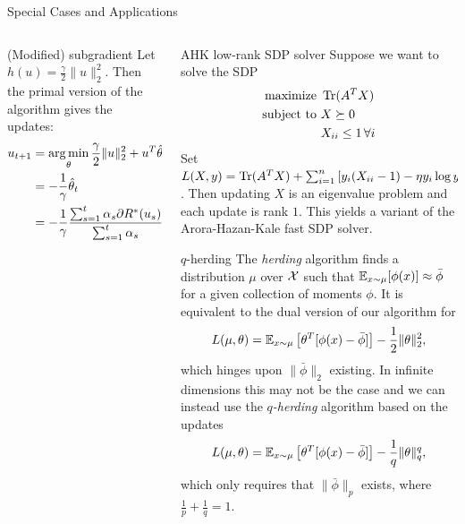 \documentclass[final]{beamer}
\begin{document}
\begin{frame}{}
\begin{columns}
\begin{column}{0.50\linewidth}
\begin{block}{\large Special Cases and Applications}
\begin{columns}[t]
\begin{column}{0.47\linewidth}
\begin{block}{(Modified) subgradient}
Let $h(u) = \frac{\gamma}{2} \|u\|_2^2$. Then the primal version of the 
algorithm gives the updates:
\begin{align*}
u_{t+1} &= \argmin_{\theta} \frac{\gamma}{2}\|u\|_2^2 + u^T\hat{\theta}_t \\
 &= -\frac{1}{\gamma}\hat{\theta}_t \\
 &= -\frac{1}{\gamma} \frac{\sum_{s=1}^t \alpha_s \partial R^*(u_s)}{\sum_{s=1}^t \alpha_s}.
\end{align*}
\end{block}

\end{column}
\begin{column}{0.47\linewidth}
\begin{block}{AHK low-rank SDP solver}
Suppose we want to solve the SDP
\begin{align*}
\text{maximize }   & \operatorname{Tr}(A^TX) \\
\text{subject to } & X \succeq 0 \\
                  & X_{ii} \leq 1 \, \forall i
\end{align*}
Set \small{$L(X,y) = \operatorname{Tr}(A^TX) + \sum_{i=1}^n \left[y_i(X_{ii}-1) - \eta y_i\log y_i\right]$}.
Then updating $X$ is an eigenvalue problem and each update is rank $1$. This 
yields a variant of the Arora-Hazan-Kale fast SDP solver.
\end{block}

\begin{block}{$q$-herding}
The \emph{herding} algorithm finds a distribution $\mu$ over 
$\mathcal{X}$ such that $\mathbb{E}_{x \sim \mu}[\phi(x)] \approx \bar{\phi}$ 
for a given collection of moments $\phi$. It is equivalent to 
the dual version of our algorithm for
\[ L(\mu,\theta) = \mathbb{E}_{x \sim \mu}\left[\theta^T[\phi(x)-\bar{\phi}]\right] - \frac{1}{2}\|\theta\|_2^2, \]
which hinges upon $\|\bar{\phi}\|_2$ existing. In infinite 
dimensions this may not be the case and we can instead use the 
\emph{$q$-herding} algorithm based on the updates
\[ L(\mu,\theta) = \mathbb{E}_{x \sim \mu}\left[\theta^T[\phi(x)-\bar{\phi}]\right] - \frac{1}{q}\|\theta\|_q^q, \]
which only requires that $\|\bar{\phi}\|_p$ exists, where $\frac{1}{p} + \frac{1}{q} = 1$.
\end{block}

\end{column}
\end{columns}
\end{block}


\end{column}
\end{columns}
\end{frame}
\end{document}
